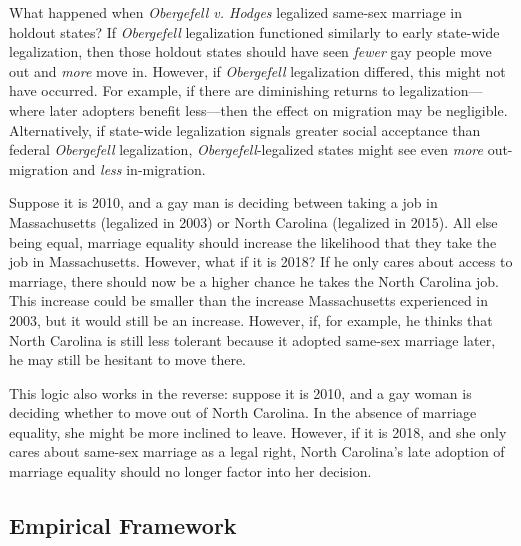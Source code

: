 \documentclass[12pt,letterpaper]{article}
\begin{document}
What happened when \textit{Obergefell v. Hodges} legalized same-sex marriage in holdout states? If \textit{Obergefell} legalization functioned similarly to early state-wide legalization, then those holdout states should have seen \textit{fewer} gay people move out and \textit{more} move in. However, if \textit{Obergefell} legalization differed, this might not have occurred. For example, if there are diminishing returns to legalization—where later adopters benefit less—then the effect on migration may be negligible. Alternatively, if state-wide legalization signals greater social acceptance than federal \textit{Obergefell} legalization, \textit{Obergefell}-legalized states might see even \textit{more} out-migration and \textit{less} in-migration.

Suppose it is 2010, and a gay man is deciding between taking a job in Massachusetts (legalized in 2003) or North Carolina (legalized in 2015). All else being equal, marriage equality should increase the likelihood that they take the job in Massachusetts. However, what if it is 2018? If he only cares about access to marriage, there should now be a higher chance he takes the North Carolina job. This increase could be smaller than the increase Massachusetts experienced in 2003, but it would still be an increase. However, if, for example, he thinks that North Carolina is still less tolerant because it adopted same-sex marriage later, he may still be hesitant to move there.

This logic also works in the reverse: suppose it is 2010, and a gay woman is deciding whether to move out of North Carolina. In the absence of marriage equality, she might be more inclined to leave. However, if it is 2018, and she only cares about same-sex marriage as a legal right, North Carolina’s late adoption of marriage equality should no longer factor into her decision. 


\subsection{Empirical Framework}
\end{document}

